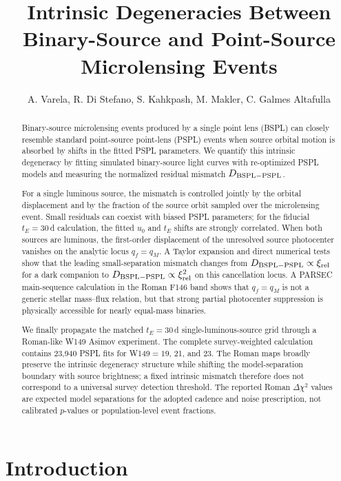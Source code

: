 \documentclass{article}
\title{Intrinsic Degeneracies Between Binary-Source and Point-Source Microlensing Events}
\author{A. Varela, R. Di Stefano, S. Kahkpash, M. Makler, C. Galmes Altafulla}
\begin{document}
\maketitle


\begin{abstract}
Binary-source microlensing events produced by a single point lens (BSPL)
can closely resemble standard point-source point-lens (PSPL) events when
source orbital motion is absorbed by shifts in the fitted PSPL
parameters. We quantify this intrinsic degeneracy by fitting simulated
binary-source light curves with re-optimized PSPL models and measuring
the normalized residual mismatch $D_{\rm BSPL-PSPL}$.

For a single luminous source, the mismatch is controlled jointly by the
orbital displacement and by the fraction of the source orbit sampled over
the microlensing event. Small residuals can coexist with biased PSPL
parameters; for the fiducial $t_E=30\,$d calculation, the fitted $u_0$ and
$t_E$ shifts are strongly correlated. When both sources are luminous, the
first-order displacement of the unresolved source photocenter vanishes on
the analytic locus $q_f=q_M$. A Taylor expansion and direct numerical tests
show that the leading small-separation mismatch changes from
$D_{\rm BSPL-PSPL}\propto\xi_{\rm rel}$ for a dark companion to
$D_{\rm BSPL-PSPL}\propto\xi_{\rm rel}^{2}$ on this cancellation locus.
A PARSEC main-sequence calculation in the Roman F146 band shows that
$q_f=q_M$ is not a generic stellar mass--flux relation, but that strong
partial photocenter suppression is physically accessible for nearly
equal-mass binaries.

We finally propagate the matched $t_E=30\,$d single-luminous-source grid
through a Roman-like W149 Asimov experiment. The complete survey-weighted
calculation contains 23,940 PSPL fits for W149$=19$, 21, and 23. The Roman
maps broadly preserve the intrinsic degeneracy structure while shifting
the model-separation boundary with source brightness; a fixed intrinsic
mismatch therefore does not correspond to a universal survey detection
threshold. The reported Roman $\Delta\chi^2$ values are expected model
separations for the adopted cadence and noise prescription, not calibrated
$p$-values or population-level event fractions.
\end{abstract}


\section{Introduction}
\label{sec:introduction}
\end{document}
